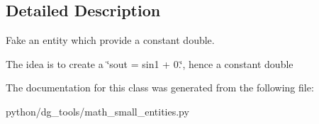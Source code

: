 \subsection{Detailed Description}
Fake an entity which provide a constant double. 

The idea is to create a \char`\"{}sout = sin1 + 0.\char`\"{}, hence a constant double 

The documentation for this class was generated from the following file\+:\begin{DoxyCompactItemize}
\item 
python/dg\+\_\+tools/math\+\_\+small\+\_\+entities.\+py\end{DoxyCompactItemize}
